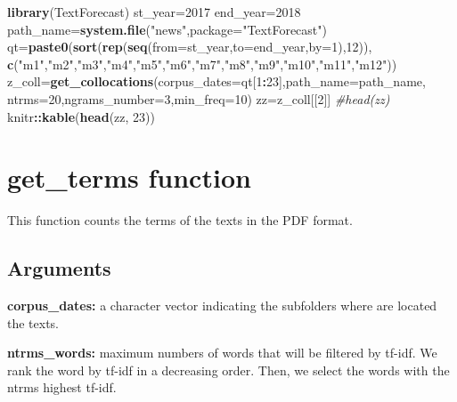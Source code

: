 \documentclass[]{article}
\newenvironment{Shaded}{\begin{snugshade}}{\end{snugshade}}
\newcommand{\KeywordTok}[1]{\textcolor[rgb]{0.13,0.29,0.53}{\textbf{#1}}}
\newcommand{\DataTypeTok}[1]{\textcolor[rgb]{0.13,0.29,0.53}{#1}}
\newcommand{\DecValTok}[1]{\textcolor[rgb]{0.00,0.00,0.81}{#1}}
\newcommand{\StringTok}[1]{\textcolor[rgb]{0.31,0.60,0.02}{#1}}
\newcommand{\CommentTok}[1]{\textcolor[rgb]{0.56,0.35,0.01}{\textit{#1}}}
\newcommand{\OperatorTok}[1]{\textcolor[rgb]{0.81,0.36,0.00}{\textbf{#1}}}
\newcommand{\NormalTok}[1]{#1}
\begin{document}
\begin{Shaded}
\begin{Highlighting}[]
\KeywordTok{library}\NormalTok{(TextForecast)}
\NormalTok{st_year=}\DecValTok{2017}
\NormalTok{end_year=}\DecValTok{2018}
\NormalTok{path_name=}\KeywordTok{system.file}\NormalTok{(}\StringTok{"news"}\NormalTok{,}\DataTypeTok{package=}\StringTok{"TextForecast"}\NormalTok{)}
\NormalTok{qt=}\KeywordTok{paste0}\NormalTok{(}\KeywordTok{sort}\NormalTok{(}\KeywordTok{rep}\NormalTok{(}\KeywordTok{seq}\NormalTok{(}\DataTypeTok{from=}\NormalTok{st_year,}\DataTypeTok{to=}\NormalTok{end_year,}\DataTypeTok{by=}\DecValTok{1}\NormalTok{),}\DecValTok{12}\NormalTok{)),}
\KeywordTok{c}\NormalTok{(}\StringTok{"m1"}\NormalTok{,}\StringTok{"m2"}\NormalTok{,}\StringTok{"m3"}\NormalTok{,}\StringTok{"m4"}\NormalTok{,}\StringTok{"m5"}\NormalTok{,}\StringTok{"m6"}\NormalTok{,}\StringTok{"m7"}\NormalTok{,}\StringTok{"m8"}\NormalTok{,}\StringTok{"m9"}\NormalTok{,}\StringTok{"m10"}\NormalTok{,}\StringTok{"m11"}\NormalTok{,}\StringTok{"m12"}\NormalTok{))}
\NormalTok{z_coll=}\KeywordTok{get_collocations}\NormalTok{(}\DataTypeTok{corpus_dates=}\NormalTok{qt[}\DecValTok{1}\OperatorTok{:}\DecValTok{23}\NormalTok{],}\DataTypeTok{path_name=}\NormalTok{path_name,}
\DataTypeTok{ntrms=}\DecValTok{20}\NormalTok{,}\DataTypeTok{ngrams_number=}\DecValTok{3}\NormalTok{,}\DataTypeTok{min_freq=}\DecValTok{10}\NormalTok{)}
\NormalTok{zz=z_coll[[}\DecValTok{2}\NormalTok{]]}
\CommentTok{#head(zz)}
\NormalTok{knitr}\OperatorTok{::}\KeywordTok{kable}\NormalTok{(}\KeywordTok{head}\NormalTok{(zz, }\DecValTok{23}\NormalTok{))}
\end{Highlighting}
\end{Shaded}

\section{get\_terms function}\label{get_terms-function}

This function counts the terms of the texts in the PDF format.

\subsection{Arguments}\label{arguments-2}

\textbf{corpus\_dates:} a character vector indicating the subfolders
where are located the texts.

\textbf{ntrms\_words:} maximum numbers of words that will be filtered by
tf-idf. We rank the word by tf-idf in a decreasing order. Then, we
select the words with the ntrms highest tf-idf.
\end{document}
